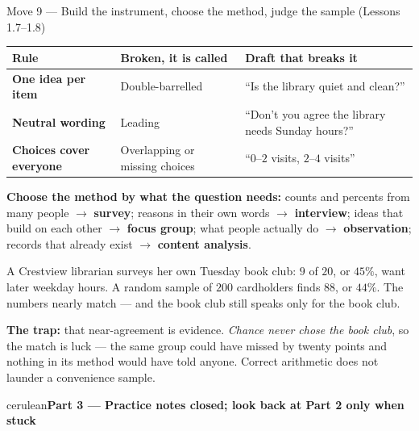 \documentclass[10pt]{article}
\newcommand{\parthead}[1]{%
  \vspace{6pt}\noindent
  \begin{headlinebox}{cerulean}{\color{white}\bfseries #1}\end{headlinebox}%
  \vspace{4pt}}
\begin{document}
\vspace{3pt}
\boxguard[18]
\begin{notesbox}{Move 9 --- Build the instrument, choose the method, judge the sample (Lessons 1.7--1.8)}
\small
\renewcommand{\arraystretch}{1.2}
\begin{tabularx}{\linewidth}{@{} >{\bfseries}p{2.6cm} X X @{}}
\rowcolor{frost}
\textbf{Rule} & \textbf{Broken, it is called} & \textbf{Draft that breaks it} \\
\midrule
One idea per item & Double-barrelled & ``Is the library quiet and clean?'' \\
Neutral wording & Leading & ``Don't you agree the library needs Sunday hours?'' \\
Choices cover everyone & Overlapping or missing choices & ``$0$--$2$ visits, $2$--$4$
  visits'' \\
\end{tabularx}

\vspace{3pt}
\textbf{Choose the method by what the question needs:} counts and percents from many people
$\rightarrow$ \textbf{survey}; reasons in their own words $\rightarrow$ \textbf{interview};
ideas that build on each other $\rightarrow$ \textbf{focus group}; what people actually do
$\rightarrow$ \textbf{observation}; records that already exist $\rightarrow$ \textbf{content
analysis}.

\vspace{3pt}
A Crestview librarian surveys her own Tuesday book club: $9$ of $20$, or $45\%$, want later
weekday hours. A random sample of $200$ cardholders finds $88$, or $44\%$. The numbers nearly
match --- and the book club still speaks only for the book club.

\vspace{2pt}
\textbf{The trap:} that near-agreement is evidence. \emph{Chance never chose the book club}, so
the match is luck --- the same group could have missed by twenty points and nothing in its
method would have told anyone. Correct arithmetic does not launder a convenience sample.
\end{notesbox}
\normalsize

\boxguard[22]
\parthead{Part 3 --- Practice \hfill notes closed; look back at Part 2 only when stuck}
\end{document}
